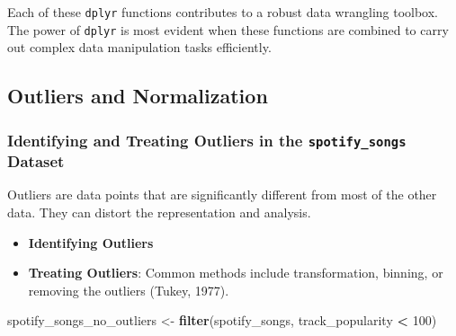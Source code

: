 \documentclass[
]{book}
\newenvironment{Shaded}{\begin{snugshade}}{\end{snugshade}}
\newcommand{\DecValTok}[1]{\textcolor[rgb]{0.00,0.00,0.81}{#1}}
\newcommand{\FunctionTok}[1]{\textcolor[rgb]{0.13,0.29,0.53}{\textbf{#1}}}
\newcommand{\NormalTok}[1]{#1}
\newcommand{\OtherTok}[1]{\textcolor[rgb]{0.56,0.35,0.01}{#1}}
\newcommand{\SpecialCharTok}[1]{\textcolor[rgb]{0.81,0.36,0.00}{\textbf{#1}}}
\providecommand{\tightlist}{%
  \setlength{\itemsep}{0pt}\setlength{\parskip}{0pt}}
\begin{document}
Each of these \texttt{dplyr} functions contributes to a robust data wrangling toolbox. The power of \texttt{dplyr} is most evident when these functions are combined to carry out complex data manipulation tasks efficiently.

\subsection*{Outliers and Normalization}\label{outliers-and-normalization}

\subsubsection*{\texorpdfstring{Identifying and Treating Outliers in the \texttt{spotify\_songs} Dataset}{Identifying and Treating Outliers in the spotify\_songs Dataset}}\label{identifying-and-treating-outliers-in-the-spotify_songs-dataset}

Outliers are data points that are significantly different from most of the other data. They can distort the representation and analysis.

\begin{itemize}
\tightlist
\item
  \textbf{Identifying Outliers}
\end{itemize}

\begin{Shaded}
\end{Shaded}

\begin{itemize}
\tightlist
\item
  \textbf{Treating Outliers}: Common methods include transformation, binning, or removing the outliers (Tukey, 1977).
\end{itemize}

\begin{Shaded}
\begin{Highlighting}[]
\NormalTok{spotify\_songs\_no\_outliers }\OtherTok{\textless{}{-}} \FunctionTok{filter}\NormalTok{(spotify\_songs, track\_popularity }\SpecialCharTok{\textless{}} \DecValTok{100}\NormalTok{)}
\end{Highlighting}
\end{Shaded}
\end{document}
